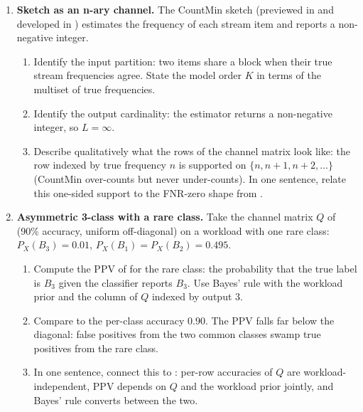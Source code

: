 \begin{enumerate}
\item \exstarstar
\label{ex:ch9-7}
\textbf{Sketch as an n-ary channel.}
The CountMin sketch (previewed in 
and developed in ) estimates the frequency of
each stream item and reports a non-negative integer.
\begin{enumerate}
  \item[(a)] Identify the input partition: two items share a
    block when their true stream frequencies agree. State the
    model order $K$ in terms of the multiset of true frequencies.
  \item[(b)] Identify the output cardinality: the estimator
    returns a non-negative integer, so $L = \infty$.
  \item[(c)] Describe qualitatively what the rows of the channel
    matrix look like: the row indexed by true frequency $n$ is
    supported on $\{n, n + 1, n + 2, \ldots\}$ (CountMin
    over-counts but never under-counts). In one sentence, relate
    this one-sided support to the FNR-zero shape from
    .
\end{enumerate}

\item \exstarstar
\label{ex:ch9-8}
\textbf{Asymmetric 3-class with a rare class.}
Take the channel matrix $Q$ of  (90\% accuracy,
uniform off-diagonal) on a workload with one rare class: $P_X(B_3)
= 0.01$, $P_X(B_1) = P_X(B_2) = 0.495$.
\begin{enumerate}
  \item[(a)] Compute the PPV of  for the rare class:
    the probability that the true label is $B_3$ given the
    classifier reports $B_3$. Use Bayes' rule with the workload
    prior and the column of $Q$ indexed by output $3$.
  \item[(b)] Compare to the per-class accuracy $0.90$. The PPV
    falls far below the diagonal: false positives from the two
    common classes swamp true positives from the rare class.
  \item[(c)] In one sentence, connect this to
    : per-row accuracies of $Q$ are
    workload-independent, PPV depends on $Q$ and the workload
    prior jointly, and Bayes' rule converts between the two.
\end{enumerate}



\end{enumerate}
